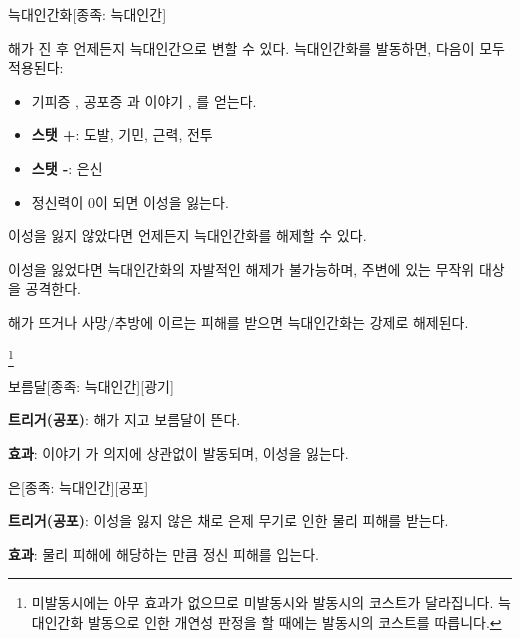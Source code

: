 \documentclass{report}
\begin{document}
	\begin{story}{늑대인간화}{[종족: 늑대인간]}
		
		해가 진 후 언제든지 늑대인간으로 변할 수 있다. 늑대인간화를 발동하면, 다음이 모두 적용된다:
		\begin{itemize}
			\item 기피증 , 공포증 과 이야기 , 를 얻는다.
			\item \textbf{스탯 +}: 도발, 기민, 근력, 전투
			\item \textbf{스탯 -}: 은신
			\item 정신력이 0이 되면 이성을 잃는다.
		\end{itemize}
		
		이성을 잃지 않았다면 언제든지 늑대인간화를 해제할 수 있다.
		
		이성을 잃었다면 늑대인간화의 자발적인 해제가 불가능하며, 주변에 있는 무작위 대상을 공격한다.
		
		\smallskip
		
		해가 뜨거나 사망/추방에 이르는 피해를 받으면 늑대인간화는 강제로 해제된다.
		
		\smallskip
		
		\footnote{미발동시에는 아무 효과가 없으므로 미발동시와 발동시의 코스트가 달라집니다. 늑대인간화 발동으로 인한 개연성 판정을 할 때에는 발동시의 코스트를 따릅니다.}
	\end{story}
	
	\begin{story}{보름달}{[종족: 늑대인간][광기]}
		
		\textbf{트리거(공포)}: 해가 지고 보름달이 뜬다.
		
		\textbf{효과}: 이야기 가 의지에 상관없이 발동되며, 이성을 잃는다.
		
		\smallskip
		
	\end{story}
	
	\begin{story}{은}{[종족: 늑대인간][공포]}
		
		\textbf{트리거(공포)}: 이성을 잃지 않은 채로 은제 무기로 인한 물리 피해를 받는다.
		
		\textbf{효과}: 물리 피해에 해당하는 만큼 정신 피해를 입는다.
		
		\smallskip
		
	\end{story}
	
\end{document}
